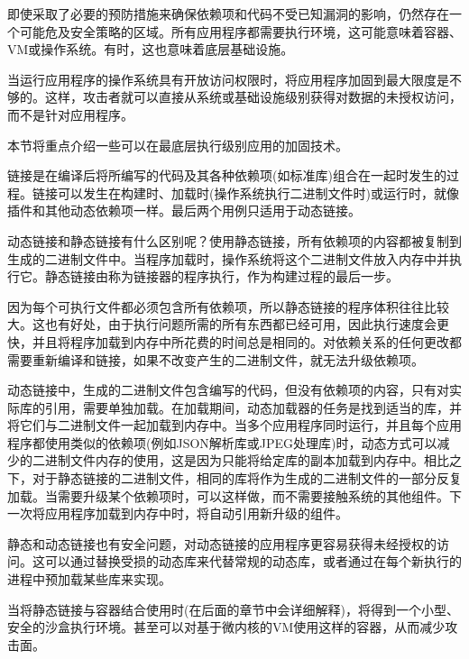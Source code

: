 
即使采取了必要的预防措施来确保依赖项和代码不受已知漏洞的影响，仍然存在一个可能危及安全策略的区域。所有应用程序都需要执行环境，这可能意味着容器、VM或操作系统。有时，这也意味着底层基础设施。

当运行应用程序的操作系统具有开放访问权限时，将应用程序加固到最大限度是不够的。这样，攻击者就可以直接从系统或基础设施级别获得对数据的未授权访问，而不是针对应用程序。

本节将重点介绍一些可以在最底层执行级别应用的加固技术。


链接是在编译后将所编写的代码及其各种依赖项(如标准库)组合在一起时发生的过程。链接可以发生在构建时、加载时(操作系统执行二进制文件时)或运行时，就像插件和其他动态依赖项一样。最后两个用例只适用于动态链接。

动态链接和静态链接有什么区别呢？使用静态链接，所有依赖项的内容都被复制到生成的二进制文件中。当程序加载时，操作系统将这个二进制文件放入内存中并执行它。静态链接由称为链接器的程序执行，作为构建过程的最后一步。

因为每个可执行文件都必须包含所有依赖项，所以静态链接的程序体积往往比较大。这也有好处，由于执行问题所需的所有东西都已经可用，因此执行速度会更快，并且将程序加载到内存中所花费的时间总是相同的。对依赖关系的任何更改都需要重新编译和链接，如果不改变产生的二进制文件，就无法升级依赖项。

动态链接中，生成的二进制文件包含编写的代码，但没有依赖项的内容，只有对实际库的引用，需要单独加载。在加载期间，动态加载器的任务是找到适当的库，并将它们与二进制文件一起加载到内存中。当多个应用程序同时运行，并且每个应用程序都使用类似的依赖项(例如JSON解析库或JPEG处理库)时，动态方式可以减少的二进制文件内存的使用，这是因为只能将给定库的副本加载到内存中。相比之下，对于静态链接的二进制文件，相同的库将作为生成的二进制文件的一部分反复加载。当需要升级某个依赖项时，可以这样做，而不需要接触系统的其他组件。下一次将应用程序加载到内存中时，将自动引用新升级的组件。

静态和动态链接也有安全问题，对动态链接的应用程序更容易获得未经授权的访问。这可以通过替换受损的动态库来代替常规的动态库，或者通过在每个新执行的进程中预加载某些库来实现。

当将静态链接与容器结合使用时(在后面的章节中会详细解释)，将得到一个小型、安全的沙盒执行环境。甚至可以对基于微内核的VM使用这样的容器，从而减少攻击面。


